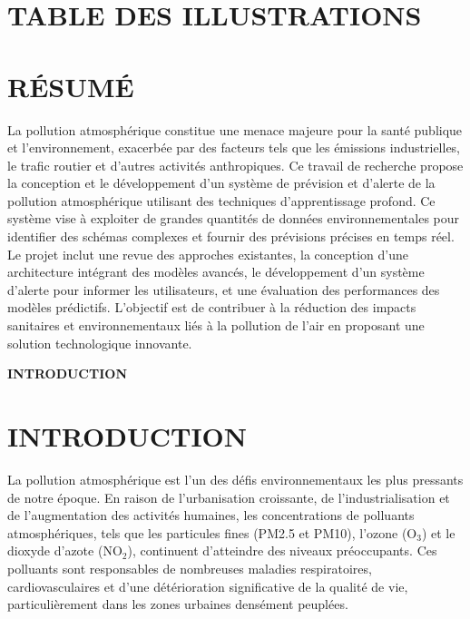 \documentclass[12pt,a4paper]{report}
\begin{document}
\newpage
{}
{}
\chapter*{TABLE DES ILLUSTRATIONS}
\listoffigures

\newpage
{}
{}
\chapter*{RÉSUMÉ}
La pollution atmosphérique constitue une menace majeure pour la santé publique et l’environnement, exacerbée par des facteurs tels que les émissions industrielles, le trafic routier et d’autres activités anthropiques. Ce travail de recherche propose la conception et le développement d’un système de prévision et d’alerte de la pollution atmosphérique utilisant des techniques d’apprentissage profond. Ce système vise à exploiter de grandes quantités de données environnementales pour identifier des schémas complexes et fournir des prévisions précises en temps réel. Le projet inclut une revue des approches existantes, la conception d’une architecture intégrant des modèles avancés, le développement d’un système d’alerte pour informer les utilisateurs, et une évaluation des performances des modèles prédictifs. L’objectif est de contribuer à la réduction des impacts sanitaires et environnementaux liés à la pollution de l’air en proposant une solution technologique innovante.

\newpage
\thispagestyle{empty}
\begin{center}
\vspace*{\fill}
{\Huge\textbf{INTRODUCTION}}
\vspace*{\fill}
\end{center}

\chapter{INTRODUCTION}
La pollution atmosphérique est l’un des défis environnementaux les plus pressants de notre époque. En raison de l’urbanisation croissante, de l’industrialisation et de l’augmentation des activités humaines, les concentrations de polluants atmosphériques, tels que les particules fines (PM2.5 et PM10), l’ozone (O$_3$) et le dioxyde d’azote (NO$_2$), continuent d’atteindre des niveaux préoccupants. Ces polluants sont responsables de nombreuses maladies respiratoires, cardiovasculaires et d’une détérioration significative de la qualité de vie, particulièrement dans les zones urbaines densément peuplées.
\end{document}
